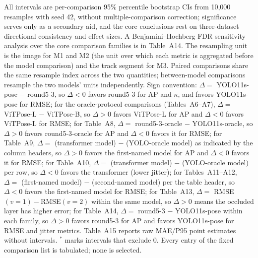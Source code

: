 \documentclass[10pt,conference]{IEEEtran}
\begin{document}
All intervals are per-comparison 95\% percentile bootstrap CIs from 10,000 resamples with seed 42, without multiple-comparison correction; significance serves only as a secondary aid, and the core conclusions rest on three-dataset directional consistency and effect sizes. A Benjamini--Hochberg FDR sensitivity analysis over the core comparison families is in Table~A14. The resampling unit is the image for M1 and M2 (the unit over which each metric is aggregated before the model comparison) and the track segment for M3. Paired comparisons share the same resample index across the two quantities; between-model comparisons resample the two models' units independently. Sign convention: $\Delta=$ YOLO11s-pose $-$ round5-3, so $\Delta<0$ favors round5-3 for AP and $\kappa$, and favors YOLO11s-pose for RMSE; for the oracle-protocol comparisons (Tables~A6--A7), $\Delta=$ ViTPose-L $-$ ViTPose-B, so $\Delta>0$ favors ViTPose-L for AP and $\Delta<0$ favors ViTPose-L for RMSE; for Table~A8, $\Delta=$ round5-3-oracle $-$ YOLO11s-oracle, so $\Delta>0$ favors round5-3-oracle for AP and $\Delta<0$ favors it for RMSE; for Table~A9, $\Delta=$ (transformer model) $-$ (YOLO-oracle model) as indicated by the column headers, so $\Delta>0$ favors the first-named model for AP and $\Delta<0$ favors it for RMSE; for Table~A10, $\Delta=$ (transformer model) $-$ (YOLO-oracle model) per row, so $\Delta<0$ favors the transformer (lower jitter); for Tables~A11--A12, $\Delta=$ (first-named model) $-$ (second-named model) per the table header, so $\Delta<0$ favors the first-named model for RMSE; for Table~A13, $\Delta=$ RMSE$(v{=}1)-$RMSE$(v{=}2)$ within the same model, so $\Delta>0$ means the occluded layer has higher error; for Table~A14, $\Delta=$ round5-3 $-$ YOLO11s-pose within each family, so $\Delta>0$ favors round5-3 for AP and favors YOLO11s-pose for RMSE and jitter metrics. Table~A15 reports raw MAE/P95 point estimates without intervals. $^{*}$ marks intervals that exclude 0. Every entry of the fixed comparison list is tabulated; none is selected.


\end{document}
